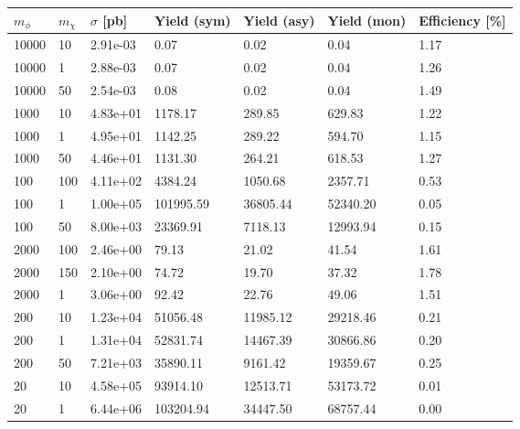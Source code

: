 \begin{table}
\renewcommand{\arraystretch}{1.0}
\small
\centering
\begin{tabular}{lllllll}
\hline
$m_\phi$ & $m_\chi$ & $\sigma$ [pb] & Yield (sym) & Yield (asy) & Yield (mon) & Efficiency [\%] \\ \hline
10000     &   10        &   2.91e-03  &   0.07      &   0.02      &   0.04      &   1.17      \\ 
10000     &   1         &   2.88e-03  &   0.07      &   0.02      &   0.04      &   1.26      \\ 
10000     &   50        &   2.54e-03  &   0.08      &   0.02      &   0.04      &   1.49      \\ 
1000      &   10        &   4.83e+01  &   1178.17   &   289.85    &   629.83    &   1.22      \\ 
1000      &   1         &   4.95e+01  &   1142.25   &   289.22    &   594.70    &   1.15      \\ 
1000      &   50        &   4.46e+01  &   1131.30   &   264.21    &   618.53    &   1.27      \\ 
100       &   100       &   4.11e+02  &   4384.24   &   1050.68   &   2357.71   &   0.53      \\ 
100       &   1         &   1.00e+05  &   101995.59 &   36805.44  &   52340.20  &   0.05      \\ 
100       &   50        &   8.00e+03  &   23369.91  &   7118.13   &   12993.94  &   0.15      \\ 
2000      &   100       &   2.46e+00  &   79.13     &   21.02     &   41.54     &   1.61      \\ 
2000      &   150       &   2.10e+00  &   74.72     &   19.70     &   37.32     &   1.78      \\ 
2000      &   1         &   3.06e+00  &   92.42     &   22.76     &   49.06     &   1.51      \\ 
200       &   10        &   1.23e+04  &   51056.48  &   11985.12  &   29218.46  &   0.21      \\ 
200       &   1         &   1.31e+04  &   52831.74  &   14467.39  &   30866.86  &   0.20      \\ 
200       &   50        &   7.21e+03  &   35890.11  &   9161.42   &   19359.67  &   0.25      \\ 
20        &   10        &   4.58e+05  &   93914.10  &   12513.71  &   53173.72  &   0.01      \\ 
20        &   1         &   6.44e+06  &   103204.94 &   34447.50  &   68757.44  &   0.00      \\ 

\end{tabular}
\end{table}
